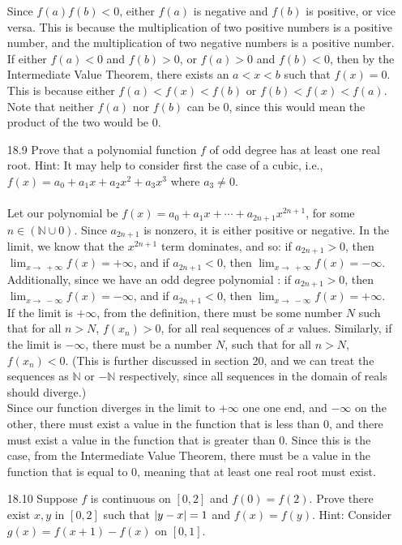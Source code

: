 \begin{enumerate}
    Since $f(a)f(b) < 0$, either $f(a)$ is negative and $f(b)$ is positive, or vice versa. This is because the multiplication of two positive numbers is a positive number, and the multiplication of two negative numbers is a positive number. If either $f(a) < 0$ and $f(b) > 0$, or $f(a) > 0$ and $f(b) < 0$, then by the Intermediate Value Theorem, there exists an $a < x < b$ such that $f(x) = 0$. This is because either $f(a) < f(x) < f(b)$ or $f(b) < f(x) < f(a)$. Note that neither $f(a)$ nor $f(b)$ can be $0$, since this would mean the product of the two would be $0$.
  \item [18.9]
    Prove that a polynomial function $f$ of odd degree has at least one real root. Hint: It may help to consider first the case of a cubic, i.e., $f(x) = a_0 + a_1x + a_2x^2 + a_3x^3$ where $a_3 \neq 0$.\\\\

    Let our polynomial be $f(x) = a_0 + a_1x + \cdots + a_{2n+1}x^{2n+1}$, for some $n \in (\mathds{N} \cup {0})$. Since $a_{2n+1}$ is nonzero, it is either positive or negative. In the limit, we know that the $x^{2n+1}$ term dominates, and so: if $a_{2n+1} > 0$, then $\lim_{x \to\ + \infty} f(x) = +\infty$, and if $a_{2n+1} < 0$, then $\lim_{x \to\ + \infty} f(x) = - \infty$. Additionally, since we have an odd degree polynomial : if $a_{2n+1} > 0$, then $\lim_{x \to\ - \infty} f(x) = - \infty$, and if $a_{2n+1} < 0$, then $\lim_{x \to\ - \infty} f(x) = + \infty$.\\

    If the limit is $+ \infty$, from the definition, there must be some number $N$ such that for all $n > N$, $f(x_n) > 0$, for all real sequences of $x$ values. Similarly, if the limit is $- \infty$, there must be a number $N$, such that for all $n > N$, $f(x_n) < 0$. (This is further discussed in section 20, and we can treat the sequences as $\mathds{N}$ or $-\mathds{N}$ respectively, since all sequences in the domain of reals should diverge.)\\

    Since our function diverges in the limit to $+\infty$ one one end, and $-\infty$ on the other, there must exist a value in the function that is less than 0, and there must exist a value in the function that is greater than 0. Since this is the case, from the Intermediate Value Theorem, there must be a value in the function that is equal to 0, meaning that at least one real root must exist. 
  \item [18.10]
    Suppose $f$ is continuous on $[0,2]$ and $f(0) = f(2)$. Prove there exist $x,y$ in $[0,2]$ such that $\left\vert y-x \right\vert = 1$ and $f(x) = f(y)$. Hint: Consider $g(x) = f(x+1) - f(x)$ on $[0,1]$.\\\\


\end{enumerate}
